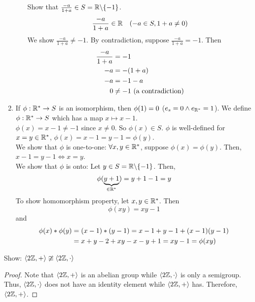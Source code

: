 \begin{solution}
\begin{enumerate}
\begin{myspace}
\begin{enumerate}[label=\textbf{(G\arabic*)}]
                Show that $\frac{-a}{1+a} \in S = \mathbb{R} \backslash \qty{-1}$. 
                \[ \frac{-a}{1+a} \in \mathbb{R} \hspace{1em} \qty(-a \in S, 1 + a \neq 0) \]
                We show $\frac{-a}{1 + a} \neq -1$. By contradiction, suppose $\frac{-a}{1+a} = -1$. Then
                \begin{align*}
                    \frac{-a}{1+a} &= -1 \\
                    -a &= - \qty(1 + a) \\
                    -a &= -1 - a \\
                    0 &\neq -1 \text{ (a contradiction)}
                \end{align*}
            \end{enumerate}
        \end{myspace}
        \item If $\phi : \mathbb{R}^* \to S$ is an isomorphism, then $\phi \qty(1) = 0$ ($e_s = 0 \land e_{\mathbb{R}^*} = 1$). We define $\phi : \mathbb{R}^* \to S$ which has a map $x \mapsto x - 1$. \\
        $\phi (x) = x -1 \neq -1$ since $x \neq 0$. So $\phi (x) \in S$. $\phi$ is well-defined for $x = y \in \mathbb{R}^*$, $\phi (x) = x - 1 = y - 1 = \phi(y)$. \\
        
        We show that $\phi$ is one-to-one: $\forall x, y \in \mathbb{R}^*$, suppose $\phi (x) = \phi (y)$. Then, $x - 1 = y - 1 \Leftrightarrow x = y$. \\
        
        We show that $\phi$ is onto: Let $y \in S = \mathbb{R} \backslash \qty{-1}$. Then,
        \[ \phi(\underbrace{y + 1}_{\in \mathbb{R}^*}) = y + 1 - 1 = y \]
        To show homomorphism property, let $x, y \in \mathbb{R}^*$. Then
        \[ \phi(xy) = xy -1\]
        and 
        \begin{align*}
            \phi(x) \ast \phi(y) &= \qty(x - 1) \ast \qty(y - 1) = x - 1 + y - 1 + \qty(x - 1) \qty(y - 1) \\
            &= x + y - 2 + xy - x - y + 1 = xy - 1 = \phi(xy)
        \end{align*}
    \end{enumerate}
\end{solution}

\begin{exercise}
    Show: $\langle 2\mathbb{Z}, + \rangle \ncong \langle 2\mathbb{Z}, \cdot \rangle$
\end{exercise}

\begin{proof}
    Note that $\langle 2\mathbb{Z}, + \rangle$ is an abelian group while $\langle 2\mathbb{Z}, \cdot \rangle$ is only a semigroup. Thus, $\langle 2\mathbb{Z}, \cdot \rangle$ does not have an identity element while $\langle 2\mathbb{Z}, + \rangle$ has. Therefore, $\langle 2\mathbb{Z}, + \rangle$. \qedsymbol
\end{proof}

